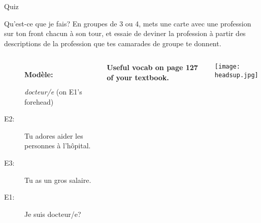 \documentclass{beamer}
\begin{document}
  \begin{frame}{}
    \begin{center}
      \Large Quiz
    \end{center}
  \end{frame}

  \begin{frame}{Qu'est-ce que je fais?}
    En groupes de 3 ou 4, mets une carte avec une profession sur ton front chacun à son tour, et essaie de deviner la profession à partir des descriptions de la profession que tes camarades de groupe te donnent. \\
    \begin{columns}
        \begin{description}
          \item[] \textbf{Modèle:}
          \item[] \emph{docteur/e} (on E1's forehead)
          \item[E2:] Tu adores aider les personnes à l'hôpital.
          \item[E3:] Tu as un gros salaire.
          \item[E1:] Je suis docteur/e?
        \end{description}
        \begin{center}
          \scriptsize
          \textbf{Useful vocab on page 127 of your textbook.}
        \end{center}
        \begin{center}
          \texttt{[image: headsup.jpg]}
        \end{center}
    \end{columns}
  \end{frame}
\end{document}
